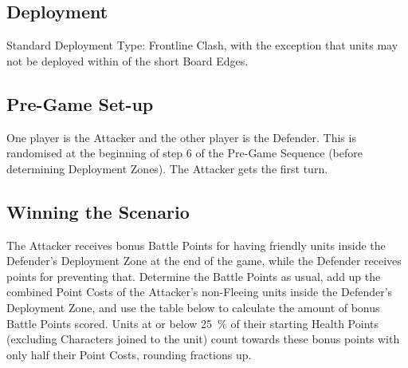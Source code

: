 
\label{MarchtoVictory}


\subsection*{Deployment}

Standard Deployment Type: Frontline Clash, with the exception that units may not be deployed within  of the short Board Edges.


\subsection*{Pre-Game Set-up}

One player is the Attacker and the other player is the Defender. This is randomised at the beginning of step 6 of the Pre-Game Sequence (before determining Deployment Zones). The Attacker gets the first turn.

\subsection*{Winning the Scenario}

The Attacker receives bonus Battle Points for having friendly units inside the Defender's Deployment Zone at the end of the game, while the Defender receives points for preventing that. Determine the Battle Points as usual, add up the combined Point Costs of the Attacker's non-Fleeing units inside the Defender's Deployment Zone, and use the table below to calculate the amount of bonus Battle Points scored. Units at or below \SI{25}{\percent} of their starting Health Points (excluding Characters joined to the unit) count towards these bonus points with only half their Point Costs, rounding fractions up.


